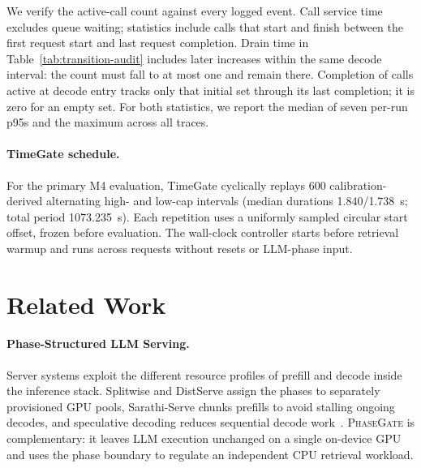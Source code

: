 \documentclass{article}
\newcommand{\system}{\textsc{PhaseGate}\xspace}
\begin{document}
We verify the active-call count against every logged event.
Call service time excludes queue waiting; statistics include calls that start and finish between the first request start and last request completion.
Drain time in Table~\ref{tab:transition-audit} includes later increases within the same decode interval: the count must fall to at most one and remain there.
Completion of calls active at decode entry tracks only that initial set through its last completion; it is zero for an empty set.
For both statistics, we report the median of seven per-run p95s and the maximum across all traces.

\paragraph{TimeGate schedule.}
For the primary M4 evaluation, TimeGate cyclically replays 600 calibration-derived alternating high- and low-cap intervals (median durations 1.840/1.738~s; total period 1073.235~s).
Each repetition uses a uniformly sampled circular start offset, frozen before evaluation.
The wall-clock controller starts before retrieval warmup and runs across requests without resets or LLM-phase input.


\clearpage
\section{Related Work}
\label{sec:related}

\paragraph{Phase-Structured LLM Serving.}
Server systems exploit the different resource profiles of prefill and decode inside the inference stack.
Splitwise and DistServe assign the phases to separately provisioned GPU pools, Sarathi-Serve chunks prefills to avoid stalling ongoing decodes, and speculative decoding reduces sequential decode work~\cite{patel2024splitwise,zhong2024distserve,agrawal2024sarathi,leviathan2023speculative}.
\system is complementary: it leaves LLM execution unchanged on a single on-device GPU and uses the phase boundary to regulate an independent CPU retrieval workload.
\end{document}
